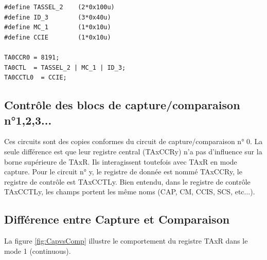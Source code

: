 \lstset{style=customc}
\begin{lstlisting}
#define TASSEL_2	(2*0x100u)
#define ID_3		(3*0x40u)
#define MC_1		(1*0x10u)
#define CCIE		(1*0x10u)

TA0CCR0 = 8191;
TA0CTL  = TASSEL_2 | MC_1 | ID_3;
TA0CCTL0  = CCIE;
\end{lstlisting}

\subsection{Contrôle des blocs de capture/comparaison n°1,2,3...}
Ces circuits sont des copies conformes du circuit de capture/comparaison n° 0. La seule différence est que leur registre central (TAxCCRy) n'a pas d'influence sur la borne supérieure de TAxR. Ils interagissent toutefois avec TAxR en mode capture.
Pour le circuit n° y, le registre de donnée est nommé TAxCCRy, le registre de contrôle est TAxCCTLy.
Bien entendu, dans le registre de contrôle TAxCCTLy, les champs portent les même noms (CAP, CM, CCIS, SCS, etc...).

\subsection{Différence entre Capture et Comparaison}
La figure \ref{fig:CapvsComp} illustre le comportement du registre TAxR dans le mode 1 (continuous).

